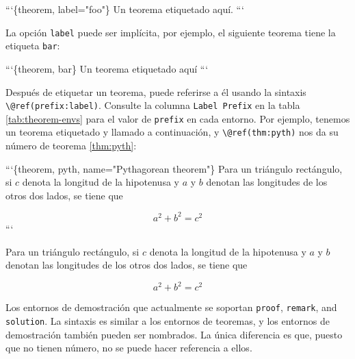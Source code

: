 \documentclass[12pt,]{krantz}
\makeatletter
\newenvironment{Shaded}{\begin{snugshade}}{\end{snugshade}}
\newcommand{\NormalTok}[1]{#1}
\newenvironment{kframe}{%
\medskip{}
\setlength{\fboxsep}{.8em}
 \def\at@end@of@kframe{}%
 \ifinner\ifhmode%
  \def\at@end@of@kframe{\end{minipage}}%
  \begin{minipage}{\columnwidth}%
 \fi\fi%
 \def\FrameCommand##1{\hskip\@totalleftmargin \hskip-\fboxsep
 \colorbox{shadecolor}{##1}\hskip-\fboxsep
     \hskip-\linewidth \hskip-\@totalleftmargin \hskip\columnwidth}%
 \MakeFramed {\advance\hsize-\width
   \@totalleftmargin\z@ \linewidth\hsize
   \@setminipage}}%
 {\par\unskip\endMakeFramed%
 \at@end@of@kframe}
\renewenvironment{Shaded}{\begin{kframe}}{\end{kframe}}
\theoremstyle{definition}
\theoremstyle{definition}
\theoremstyle{definition}
\theoremstyle{remark}
\let\BeginKnitrBlock\begin \let\EndKnitrBlock\end
\makeatother
\begin{document}
\begin{Shaded}
\begin{Highlighting}[]
\NormalTok{```\{theorem, label="foo"\}}
\NormalTok{Un teorema etiquetado aquí.}
\NormalTok{```}
\end{Highlighting}
\end{Shaded}

La opción \texttt{label} puede ser implícita, por ejemplo, el siguiente
teorema tiene la etiqueta \texttt{bar}:

\begin{Shaded}
\begin{Highlighting}[]
\NormalTok{```\{theorem, bar\}}
\NormalTok{Un teorema etiquetado aquí}
\NormalTok{```}
\end{Highlighting}
\end{Shaded}

Después de etiquetar un teorema, puede referirse a él usando la sintaxis
\texttt{\textbackslash{}@ref(prefix:label)}. 
Consulte la columna \texttt{Label\ Prefix} en la tabla
\ref{tab:theorem-envs} para el valor de \texttt{prefix} en cada entorno.
Por ejemplo, tenemos un teorema etiquetado y llamado a continuación, y
\texttt{\textbackslash{}@ref(thm:pyth)} nos da su número de teorema
\ref{thm:pyth}:

\begin{Shaded}
\begin{Highlighting}[]
\NormalTok{```\{theorem, pyth, name="Pythagorean theorem"\}}
\NormalTok{Para un triángulo rectángulo, si $c$ denota la longitud de la hipotenusa}
\NormalTok{y $a$ y $b$ denotan las longitudes de los otros dos lados, se tiene que}

\NormalTok{$$a^2 + b^2 = c^2$$}
\NormalTok{```}
\end{Highlighting}
\end{Shaded}

\BeginKnitrBlock{theorem}[Teorema de Pitágoras]
\protect\hypertarget{thm:pyth}{}{\label{thm:pyth} {} }Para un triángulo rectángulo, si \(c\) denota la
longitud de la hipotenusa y \(a\) y \(b\) denotan las longitudes de los
otros dos lados, se tiene que

\[a^2 + b^2 = c^2\]
\EndKnitrBlock{theorem}

Los entornos de demostración que actualmente se soportan \texttt{proof},
\texttt{remark}, and \texttt{solution}. La sintaxis es similar a los
entornos de teoremas, y los entornos de demostración también pueden ser
nombrados. La única diferencia es que, puesto que no tienen número, no
se puede hacer referencia a ellos.
\end{document}
